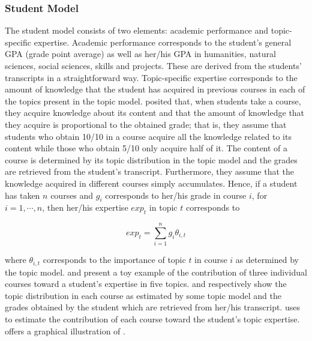 \documentclass[pmlr]{jmlr}%
\begin{document}
\subsubsection{Student Model}
\label{sec:sm}
The student model consists of two elements: academic performance and topic-specific expertise. Academic performance corresponds to the student's general GPA (grade point average) as well as her/his GPA in humanities, natural sciences, social sciences, skills and projects. These are derived from the students' transcripts in a straightforward way. Topic-specific expertise corresponds to the amount of knowledge that the student has acquired  in previous courses in each of the topics present in the topic model. \citet{Morsomme.2019}  posited that, when students take a course, they acquire knowledge about its content and that the amount of knowledge that they acquire is proportional to the obtained grade; that is, they assume that students who obtain 10/10 in a course acquire all the knowledge related to its content while those who obtain 5/10 only acquire half of it. The content of a course is determined by its topic distribution in the topic model and the grades are retrieved from the student's transcript. Furthermore, they assume that the knowledge acquired in different courses simply accumulates. Hence, if a student has taken $n$ courses and $g_{i}$ corresponds to her/his grade in course $i$, for $i = 1, \cdots, n$, then her/his expertise $exp_t$ in topic $t$ corresponds to

\begin{equation}
\label{eq:expertise}
exp_t = \sum_{i= 1}^{n} g_i \theta_{i,t}
\end{equation}

\noindent where $\theta_{i,t}$ corresponds to the importance of topic $t$ in course $i$ as determined by the topic model.  and  present a toy example of the contribution of three individual courses toward a student's expertise in five topics.  and  respectively show the topic distribution in each course as estimated by some topic model and the grades obtained by the student which are retrieved from her/his transcript.  uses  to estimate the contribution of each course toward the student's topic expertise.  offers a graphical illustration of .
\end{document}
